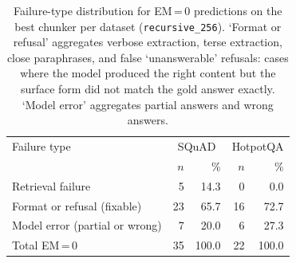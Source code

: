 \begin{table}[h]
\centering
\caption{Failure-type distribution for EM\,=\,0 predictions on the best chunker per dataset (\texttt{recursive_256}). `Format or refusal' aggregates verbose extraction, terse extraction, close paraphrases, and false `unanswerable' refusals: cases where the model produced the right content but the surface form did not match the gold answer exactly. `Model error' aggregates partial answers and wrong answers.}
\label{tab:error-analysis}
\begin{tabular}{lrrrr}
\toprule
Failure type & \multicolumn{2}{c}{SQuAD} & \multicolumn{2}{c}{HotpotQA} \\
 & $n$ & \% & $n$ & \% \\
\midrule
Retrieval failure & 5 & 14.3 & 0 & 0.0 \\
Format or refusal (fixable) & 23 & 65.7 & 16 & 72.7 \\
Model error (partial or wrong) & 7 & 20.0 & 6 & 27.3 \\
\midrule
Total EM\,=\,0 & 35 & 100.0 & 22 & 100.0 \\
\bottomrule
\end{tabular}
\end{table}
